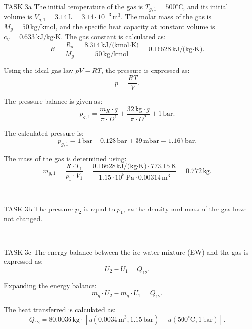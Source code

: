 TASK 3a  
The initial temperature of the gas is \( T_{g,1} = 500^\circ\text{C} \), and its initial volume is \( V_{g,1} = 3.14 \, \text{L} = 3.14 \cdot 10^{-3} \, \text{m}^3 \). The molar mass of the gas is \( M_g = 50 \, \text{kg/kmol} \), and the specific heat capacity at constant volume is \( c_V = 0.633 \, \text{kJ/kg·K} \). The gas constant is calculated as:  
\[
R = \frac{R_u}{M_g} = \frac{8.314 \, \text{kJ/(kmol·K)}}{50 \, \text{kg/kmol}} = 0.16628 \, \text{kJ/(kg·K)}.
\]

Using the ideal gas law \( pV = RT \), the pressure is expressed as:  
\[
p = \frac{RT}{V}.
\]

The pressure balance is given as:  
\[
p_{g,1} = \frac{m_K \cdot g}{\pi \cdot D^2} + \frac{32 \, \text{kg} \cdot g}{\pi \cdot D^2} + 1 \, \text{bar}.
\]

The calculated pressure is:  
\[
p_{g,1} = 1 \, \text{bar} + 0.128 \, \text{bar} + 39 \, \text{mbar} = 1.167 \, \text{bar}.
\]

The mass of the gas is determined using:  
\[
m_{g,1} = \frac{R \cdot T_1}{p_1 \cdot V_1} = \frac{0.16628 \, \text{kJ/(kg·K)} \cdot 773.15 \, \text{K}}{1.15 \cdot 10^5 \, \text{Pa} \cdot 0.00314 \, \text{m}^3} = 0.772 \, \text{kg}.
\]

---

TASK 3b  
The pressure \( p_2 \) is equal to \( p_1 \), as the density and mass of the gas have not changed.

---

TASK 3c  
The energy balance between the ice-water mixture (EW) and the gas is expressed as:  
\[
U_2 - U_1 = Q_{12}.
\]

Expanding the energy balance:  
\[
m_g \cdot U_2 - m_g \cdot U_1 = Q_{12}.
\]

The heat transferred is calculated as:  
\[
Q_{12} = 80.0036 \, \text{kg} \cdot \left[ u(0.0034 \, \text{m}^3, 1.15 \, \text{bar}) - u(500^\circ\text{C}, 1 \, \text{bar}) \right].
\]